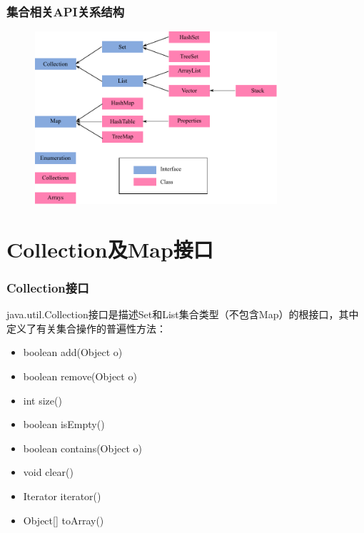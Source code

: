 \documentclass[compress,table]{beamer} %
\begin{document}
\begin{frame}[fragile] %
\frametitle{集合相关API关系结构}

 \begin{figure}
 \centering
 \includegraphics[width=0.8\textwidth]{fig01.pdf}
 \end{figure}
\end{frame}


\section{Collection及Map接口}

\begin{frame}[fragile] %
\frametitle{Collection接口}

java.util.Collection接口是描述Set和List集合类型（不包含Map）的根接口，其中定义了有关集合操作的普遍性方法：
\begin{itemize}[<+-| alert@+>]
\item boolean add(Object o)\\
\item boolean remove(Object o) \\
\item int size()\\
\item boolean isEmpty()\\
\item boolean contains(Object o) \\
\item void clear()\\
\item Iterator iterator()\\
\item Object[] toArray()\\
\end{itemize}
\end{frame}
\end{document}
